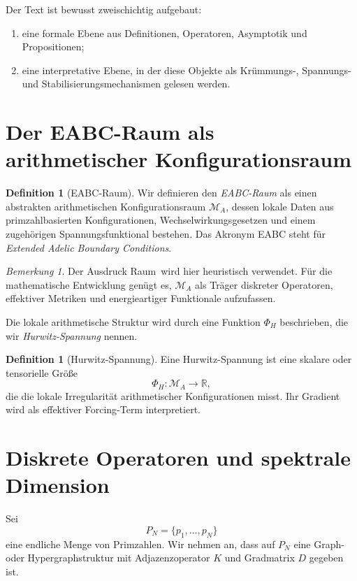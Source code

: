 \documentclass[11pt,a4paper]{amsart}
\theoremstyle{plain}
\theoremstyle{definition}
\newtheorem{definition}[satz]{Definition}
\theoremstyle{remark}
\newtheorem{bemerkung}[satz]{Bemerkung}
\newcommand{\RR}{\mathbb{R}}
\newcommand{\MA}{\mathcal{M}_A}
\newcommand{\PhiH}{\Phi_H}
\begin{document}
	Der Text ist bewusst zweischichtig aufgebaut:
	\begin{enumerate}[label=\arabic*.]
		\item eine formale Ebene aus Definitionen, Operatoren, Asymptotik und Propositionen;
		\item eine interpretative Ebene, in der diese Objekte als Krümmungs-, Spannungs- und Stabilisierungsmechanismen gelesen werden.
	\end{enumerate}
	
	\section{Der EABC-Raum als arithmetischer Konfigurationsraum}
	
	\begin{definition}[EABC-Raum]
		Wir definieren den \emph{EABC-Raum} als einen abstrakten arithmetischen Konfigurationsraum $\MA$, dessen lokale Daten aus primzahlbasierten Konfigurationen, Wechselwirkungsgesetzen und einem zugehörigen Spannungsfunktional bestehen. Das Akronym EABC steht für \emph{Extended Adelic Boundary Conditions}.
	\end{definition}
	
	\begin{bemerkung}
		Der Ausdruck \glqq Raum\grqq\ wird hier heuristisch verwendet. Für die mathematische Entwicklung genügt es, $\MA$ als Träger diskreter Operatoren, effektiver Metriken und energieartiger Funktionale aufzufassen.
	\end{bemerkung}
	
	Die lokale arithmetische Struktur wird durch eine Funktion $\PhiH$ beschrieben, die wir \emph{Hurwitz-Spannung} nennen.
	
	\begin{definition}[Hurwitz-Spannung]
		Eine Hurwitz-Spannung ist eine skalare oder tensorielle Größe
		\[
		\PhiH:\MA \to \RR,
		\]
		die die lokale Irregularität arithmetischer Konfigurationen misst. Ihr Gradient wird als effektiver Forcing-Term interpretiert.
	\end{definition}
	
	\section{Diskrete Operatoren und spektrale Dimension}
	
	Sei
	\[
	P_N=\{p_1,\dots,p_N\}
	\]
	eine endliche Menge von Primzahlen. Wir nehmen an, dass auf $P_N$ eine Graph- oder Hypergraphstruktur mit Adjazenzoperator $K$ und Gradmatrix $D$ gegeben ist.
	
\end{document}
